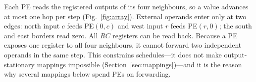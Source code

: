 Each PE reads the registered outputs of its four neighbours, so a value
advances at most one hop per step (Fig.~\ref{fig:array}). External operands
enter only at two edges: north input $c$ feeds PE$(0,c)$ and west input $r$
feeds PE$(r,0)$; the south and east borders read zero. All $RC$ registers
can be read back. Because a PE exposes one register to all four neighbours,
it cannot forward two independent operands in the same step. This
constrains schedules---it does not make output-stationary mappings
impossible (Section~\ref{sec:mappings})---and it is the reason why several
mappings below spend PEs on forwarding.


